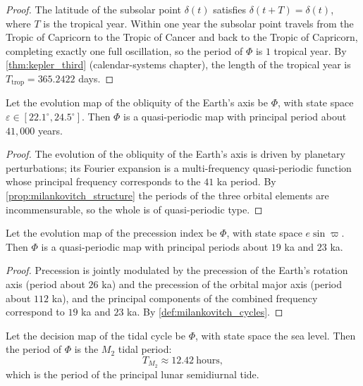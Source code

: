 \begin{proof}
The latitude of the subsolar point $\delta(t)$ satisfies $\delta(t+T)=\delta(t)$, where $T$ is the tropical year. Within one year the subsolar point travels from the Tropic of Capricorn to the Tropic of Cancer and back to the Tropic of Capricorn, completing exactly one full oscillation, so the period of $\Phi$ is $1$ tropical year. By \cref{thm:kepler_third} (calendar-systems chapter), the length of the tropical year is $T_{\text{trop}}=365.2422$ days.
\end{proof}

\begin{lemma}\label{lem:geo_obliquity_period}
Let the evolution map of the obliquity of the Earth's axis be $\Phi$, with state space $\varepsilon\in[22.1^\circ,24.5^\circ]$. Then $\Phi$ is a quasi-periodic map with principal period about $41,000$ years.
\end{lemma}

\begin{proof}
The evolution of the obliquity of the Earth's axis is driven by planetary perturbations; its Fourier expansion is a multi-frequency quasi-periodic function whose principal frequency corresponds to the $41$ ka period. By \cref{prop:milankovitch_structure} the periods of the three orbital elements are incommensurable, so the whole is of quasi-periodic type.
\end{proof}

\begin{lemma}\label{lem:geo_precession_period}
Let the evolution map of the precession index be $\Phi$, with state space $e\sin\varpi$. Then $\Phi$ is a quasi-periodic map with principal periods about $19$ ka and $23$ ka.
\end{lemma}

\begin{proof}
Precession is jointly modulated by the precession of the Earth's rotation axis (period about $26$ ka) and the precession of the orbital major axis (period about $112$ ka), and the principal components of the combined frequency correspond to $19$ ka and $23$ ka. By \cref{def:milankovitch_cycles}.
\end{proof}

\begin{lemma}\label{lem:geo_tidal_period}
Let the decision map of the tidal cycle be $\Phi$, with state space the sea level. Then the period of $\Phi$ is the $M_2$ tidal period:
\[
T_{M_2}\approx 12.42\ \text{hours},
\]
which is the period of the principal lunar semidiurnal tide.
\end{lemma}

